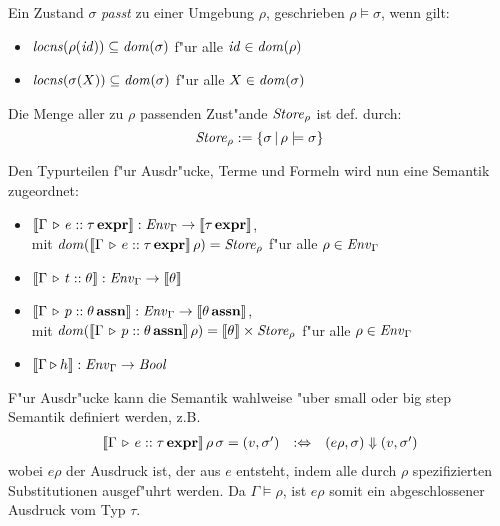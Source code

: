 \documentclass[12pt,a4paper,bigheadings]{scrartcl}
\newcommand{\semantic}[1]{\ensuremath{\llbracket#1\rrbracket}}
\newcommand{\assn}{\ensuremath{\mathbf{assn}}}
\newcommand{\atype}[1]{#1\,\assn}
\newcommand{\bexpr}{\ensuremath{\mathbf{expr}}}
\newcommand{\etype}[1]{#1\,\bexpr}
\newcommand{\locns}{\name{locns}}
\begin{document}
\noindent
Ein Zustand $\sigma$ {\em passt} zu einer Umgebung $\rho$, geschrieben $\rho \models \sigma$,
wenn gilt:
\begin{itemize}
  \item $\locns(\rho(\id)) \subseteq \dom{\sigma}$ f"ur alle ${\text{\it id\/}}\in{\text{\it dom\/}}(\rho)$
  \item $\locns(\sigma(X)) \subseteq \dom{\sigma}$ f"ur alle $X\in{\text{\it dom\/}}(\sigma)$
\end{itemize}
Die Menge aller zu $\rho$ passenden Zust"ande ${\text{\it Store\/}}_\rho$ ist def. durch:
\[
  {\text{\it Store\/}}_\rho := \{\sigma\,|\,\rho\models\sigma\}
\]

\noindent
Den Typurteilen f"ur Ausdr"ucke, Terme und Formeln wird nun eine Semantik zugeordnet:
\begin{itemize}
  \item $\semantic{\Tj{\Gamma}{e}{\etype{\tau}}}:\Env_\Gamma \to \semantic{\etype{\tau}}$, \\
        mit $\dom{\semantic{\Tj{\Gamma}{e}{\etype{\tau}}}\,\rho} = \Store_\rho$
        f"ur alle $\rho\in{\text{\it Env\/}}_\Gamma$
  \item $\semantic{\Tj{\Gamma}{t}{\theta}}:\Env_\Gamma \to \semantic{\theta}$
  \item $\semantic{\Tj{\Gamma}{p}{\atype{\theta}}}: \Env_\Gamma \to \semantic{\atype{\theta}}$, \\
        mit $\dom{\semantic{\Tj{\Gamma}{p}{\atype{\theta}}}\,\rho} = \semantic{\theta}\times\Store_\rho$
        f"ur alle $\rho\in{\text{\it Env\/}}_\Gamma$
  \item $\semantic{\Tjh{\Gamma}{h}}: \Env_\Gamma \to \Bool$
\end{itemize}

\noindent
F"ur Ausdr"ucke kann die Semantik wahlweise "uber small oder big step Semantik definiert
werden, z.B.
\[\begin{array}{rcl}
  \semantic{\Tj{\Gamma}{e}{\etype{\tau}}}\,\rho\,\sigma = (v,\sigma')
  & :\Leftrightarrow &
  (e\rho,\sigma) \Downarrow (v,\sigma')
\end{array}\]
wobei $e \rho$ der Ausdruck ist, der aus $e$ entsteht, indem alle durch $\rho$ spezifizierten
Substitutionen ausgef"uhrt werden. Da $\Gamma \models \rho$, ist $e \rho$ somit ein abgeschlossener
Ausdruck vom Typ $\tau$.
\end{document}
